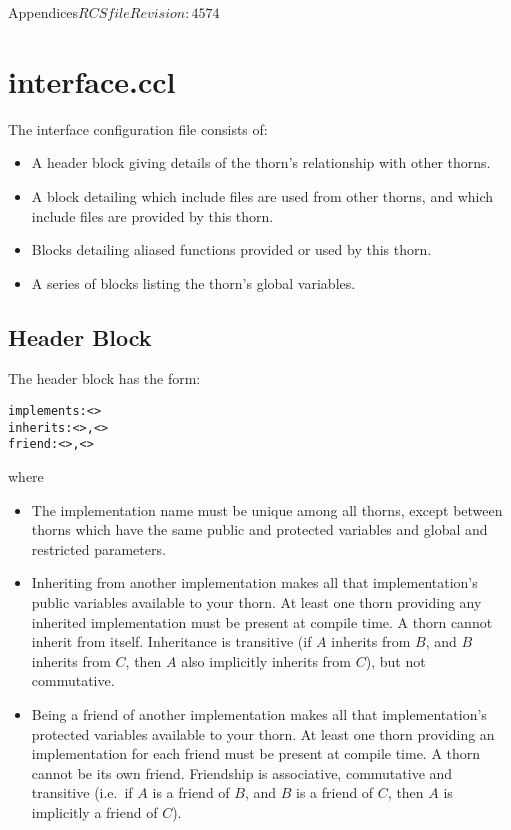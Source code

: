 \begin{cactuspart}{Appendices}{$RCSfile$}{$Revision: 4574 $}
\section{interface.ccl}
\label{sec:Appendix.interface}

The interface configuration file consists of:
\begin{itemize}
\item A header block giving details of the thorn's relationship with
other thorns.
\item A block detailing which include files are used from other
thorns, and which include files are provided by this thorn.
\item Blocks detailing aliased functions provided or used by this thorn.
\item A series of blocks listing the thorn's global variables.
\end{itemize}

\subsection{Header Block}
The header block has the form:
\begin{alltt}
implements: <>
inherits: <>, <>
friend: <>, <>
\end{alltt}
where
\begin{itemize}
\item{} The implementation name must be unique among all thorns, except
        between thorns which have the same public and protected variables and
        global and restricted parameters.
\item{} Inheriting from another implementation makes all that implementation's
        public variables available to your thorn. At least one thorn
        providing any inherited implementation must be present at compile time.
        A thorn cannot inherit from itself. Inheritance is transitive
	(if $A$ inherits from $B$, and $B$ inherits from $C$, then
	$A$ also implicitly inherits from $C$),
	but not commutative.
\item{} Being a friend of another implementation makes all that
        implementation's protected variables available to your thorn.
	At least one thorn providing an implementation for each friend
	must be present at compile time.
	A thorn cannot be its own friend.
	Friendship is associative,
	commutative
	and transitive (i.e.~if $A$ is a friend of $B$,
	and $B$ is a friend of $C$, then $A$ is implicitly a friend of $C$).
\end{itemize}


\end{cactuspart}

